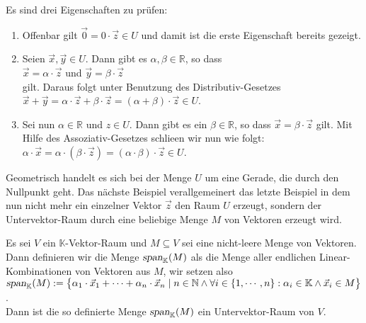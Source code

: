 \proof
Es sind drei Eigenschaften zu pr\"{u}fen:
\begin{enumerate}
\item Offenbar gilt $\vec{0} = 0 \cdot \vec{z} \in U$ und damit ist die erste Eigenschaft bereits gezeigt.
\item Seien $\vec{x}, \vec{y} \in U$.  Dann gibt es $\alpha, \beta \in \mathbb{R}$, so dass
      \\[0.2cm]
      \hspace*{1.3cm}
      $\vec{x} = \alpha \cdot \vec{z}$ \quad und \quad $\vec{y} = \beta \cdot \vec{z}$
      \\[0.2cm]
      gilt.  Daraus folgt unter Benutzung des Distributiv-Gesetzes
      \\[0.2cm]
      \hspace*{1.3cm}
      $\vec{x} + \vec{y} = \alpha \cdot \vec{z} + \beta \cdot \vec{z} = (\alpha + \beta) \cdot \vec{z} \in U$.
\item Sei nun $\alpha \in \mathbb{R}$ und $z \in U$.  Dann gibt es ein $\beta \in \mathbb{R}$, so dass
      $\vec{x} = \beta \cdot \vec{z}$ gilt.  Mit Hilfe des Assoziativ-Gesetzes schlie\3en wir nun wie folgt:
      \\[0.2cm]
      \hspace*{1.3cm}
      $\alpha \cdot \vec{x} = \alpha \cdot (\beta \cdot \vec{z}) = (\alpha \cdot \beta) \cdot \vec{z} \in U$.
      \qeds
\end{enumerate}

\remark
Geometrisch handelt es sich bei der Menge $U$ um eine Gerade, die durch den Nullpunkt geht.
Das n\"{a}chste Beispiel verallgemeinert das letzte Beispiel in dem nun nicht mehr ein einzelner Vektor
$\vec{z}$ den Raum $U$ erzeugt, sondern der Untervektor-Raum durch eine beliebige Menge $M$ von Vektoren
erzeugt wird.

\example
Es sei $V$ ein $\mathbb{K}$-Vektor-Raum und $M \subseteq V$ sei eine nicht-leere Menge von Vektoren.  Dann definieren wir die Menge
$\textsl{span}_\mathbb{K}(M)$ als die Menge aller endlichen Linear-Kombinationen von Vektoren aus $M$, wir setzen also
\\[0.2cm]
\hspace*{1.3cm}
$\textsl{span}_\mathbb{K}(M) := 
 \bigl\{ \alpha_1 \cdot \vec{x}_1 + \cdots + \alpha_n \cdot \vec{x}_n \mid n \in \mathbb{N} \wedge \forall i \in
 \{1,\cdots,n\}:\alpha_i \in \mathbb{K} \wedge \vec{x}_i \in M \bigr\}
$.
\\[0.2cm]
Dann ist die so definierte Menge $\textsl{span}_\mathbb{K}(M)$ ein Untervektor-Raum von $V$.

